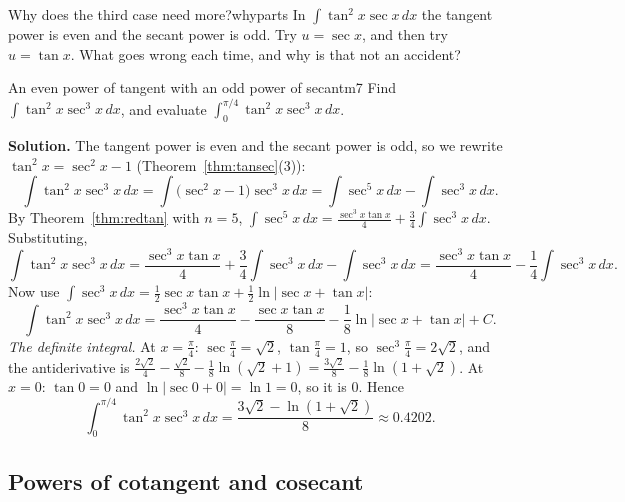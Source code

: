 \documentclass[11pt]{article}
\begin{document}
\begin{think}{Why does the third case need more?}{whyparts}
In $\int\tan^2x\sec x\,dx$ the tangent power is even and the secant power is odd. Try $u=\sec x$, and then try $u=\tan x$. What goes wrong each time, and why is that not an accident?
\end{think}

\begin{exmp}{An even power of tangent with an odd power of secant}{m7}
Find $\int\tan^2x\sec^3x\,dx$, and evaluate $\int_0^{\pi/4}\tan^2x\sec^3x\,dx$.

\textbf{Solution.} The tangent power is even and the secant power is odd, so we rewrite $\tan^2x=\sec^2x-1$ (Theorem~\ref{thm:tansec}(3)):
\[\int\tan^2x\sec^3x\,dx=\int\big(\sec^2x-1\big)\sec^3x\,dx=\int\sec^5x\,dx-\int\sec^3x\,dx .\]
By Theorem~\ref{thm:redtan} with $n=5$, $\int\sec^5x\,dx=\frac{\sec^3x\tan x}4+\frac34\int\sec^3x\,dx$. Substituting,
\[\int\tan^2x\sec^3x\,dx=\frac{\sec^3x\tan x}4+\frac34\int\sec^3x\,dx-\int\sec^3x\,dx=\frac{\sec^3x\tan x}4-\frac14\int\sec^3x\,dx .\]
Now use $\int\sec^3x\,dx=\frac12\sec x\tan x+\frac12\ln\lvert\sec x+\tan x\rvert$:
\[\int\tan^2x\sec^3x\,dx=\frac{\sec^3x\tan x}4-\frac{\sec x\tan x}8-\frac18\ln\lvert\sec x+\tan x\rvert+C .\]
\emph{The definite integral.} At $x=\frac\pi4$: $\sec\frac\pi4=\sqrt2$, $\tan\frac\pi4=1$, so $\sec^3\frac\pi4=2\sqrt2$, and the antiderivative is $\frac{2\sqrt2}4-\frac{\sqrt2}8-\frac18\ln\left(\sqrt2+1\right)=\frac{3\sqrt2}8-\frac18\ln\left(1+\sqrt2\right)$. At $x=0$: $\tan0=0$ and $\ln\lvert\sec0+0\rvert=\ln1=0$, so it is $0$. Hence
\[\int_0^{\pi/4}\tan^2x\sec^3x\,dx=\frac{3\sqrt2-\ln\left(1+\sqrt2\right)}8\approx0.4202 .\]
\end{exmp}

\subsection*{Powers of cotangent and cosecant}
\end{document}
